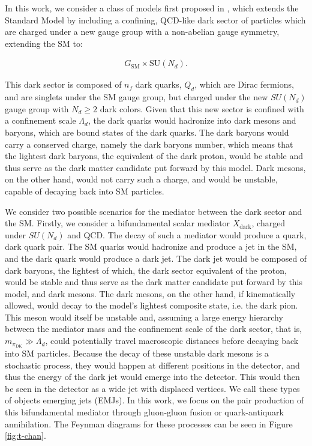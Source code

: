 In this work, we consider a class of models first proposed in \cite{schwallerEmergingJets2015}, which extends the Standard Model by including a confining, QCD-like dark sector of particles which are charged under a new gauge group with a non-abelian gauge symmetry, extending the SM to:

\begin{equation}
	\begin{aligned}
		G_{\text{SM}} \times \text{SU}(N_d).
	\end{aligned}
\end{equation}

This dark sector is composed of $n_f$ dark quarks, $Q_d$, which are Dirac fermions, and are singlets under the SM gauge group, but charged under the new $SU(N_d)$ gauge group with $N_d \geq 2$ dark colors. Given that this new sector is confined with a confinement scale $\Lambda_d$, the dark quarks would hadronize into dark mesons and baryons, which are bound states of the dark quarks. The dark baryons would carry a conserved charge, namely the dark baryons number, which means that the lightest dark baryons, the equivalent of the dark proton, would be stable and thus serve as the dark matter candidate put forward by this model. Dark mesons, on the other hand, would not carry such a charge, and would be unstable, capable of decaying back into SM particles.

We consider two possible scenarios for the mediator between the dark sector and the SM. Firstly, we consider a bifundamental scalar mediator $X_{\text{dark}}$, charged under $SU(N_d)$ and QCD. The decay of such a mediator would produce a quark, dark quark pair. The SM quarks would hadronize and produce a jet in the SM, and the dark quark would produce a dark jet. The dark jet would be composed of dark baryons, the lightest of which, the dark sector equivalent of the proton, would be stable and thus serve as the dark matter candidate put forward by this model, and dark mesons. The dark mesons, on the other hand, if kinematically allowed, would decay to the model's lightest composite state, i.e. the dark pion. This meson would itself be unstable and, assuming a large energy hierarchy between the mediator mass and the confinement scale of the dark sector, that is, $m_{\pi_{\text{DK}}} \gg \Lambda_d$, could potentially travel macroscopic distances before decaying back into SM particles. Because the decay of these unstable dark mesons is a stochastic process, they would happen at different positions in the detector, and thus the energy of the dark jet would emerge into the detector. This would then be seen in the detector as a wide jet with displaced vertices. We call these types of objects emerging jets (EMJs). In this work, we focus on the pair production of this bifundamental mediator through gluon-gluon fusion or quark-antiquark annihilation. The Feynman diagrams for these processes can be seen in Figure \ref{fig:t-chan}.

